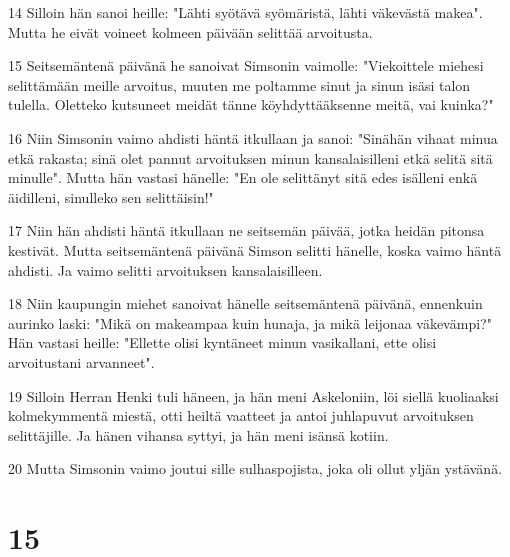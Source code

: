 \par 14 Silloin hän sanoi heille: "Lähti syötävä syömäristä, lähti väkevästä makea". Mutta he eivät voineet kolmeen päivään selittää arvoitusta.
\par 15 Seitsemäntenä päivänä he sanoivat Simsonin vaimolle: "Viekoittele miehesi selittämään meille arvoitus, muuten me poltamme sinut ja sinun isäsi talon tulella. Oletteko kutsuneet meidät tänne köyhdyttääksenne meitä, vai kuinka?"
\par 16 Niin Simsonin vaimo ahdisti häntä itkullaan ja sanoi: "Sinähän vihaat minua etkä rakasta; sinä olet pannut arvoituksen minun kansalaisilleni etkä selitä sitä minulle". Mutta hän vastasi hänelle: "En ole selittänyt sitä edes isälleni enkä äidilleni, sinulleko sen selittäisin!"
\par 17 Niin hän ahdisti häntä itkullaan ne seitsemän päivää, jotka heidän pitonsa kestivät. Mutta seitsemäntenä päivänä Simson selitti hänelle, koska vaimo häntä ahdisti. Ja vaimo selitti arvoituksen kansalaisilleen.
\par 18 Niin kaupungin miehet sanoivat hänelle seitsemäntenä päivänä, ennenkuin aurinko laski: "Mikä on makeampaa kuin hunaja, ja mikä leijonaa väkevämpi?" Hän vastasi heille: "Ellette olisi kyntäneet minun vasikallani, ette olisi arvoitustani arvanneet".
\par 19 Silloin Herran Henki tuli häneen, ja hän meni Askeloniin, löi siellä kuoliaaksi kolmekymmentä miestä, otti heiltä vaatteet ja antoi juhlapuvut arvoituksen selittäjille. Ja hänen vihansa syttyi, ja hän meni isänsä kotiin.
\par 20 Mutta Simsonin vaimo joutui sille sulhaspojista, joka oli ollut yljän ystävänä.

\chapter{15}

